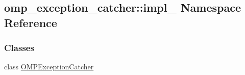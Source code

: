 \hypertarget{namespaceomp__exception__catcher_1_1impl__}{}\subsection{omp\+\_\+exception\+\_\+catcher\+:\+:impl\+\_\+ Namespace Reference}
\label{namespaceomp__exception__catcher_1_1impl__}
\subsubsection*{Classes}
\begin{DoxyCompactItemize}
\item 
class \hyperlink{classomp__exception__catcher_1_1impl___1_1OMPExceptionCatcher}{O\+M\+P\+Exception\+Catcher}
\end{DoxyCompactItemize}
